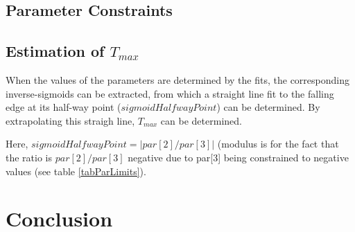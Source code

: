 \documentclass[12pt,epsfig]{article}
\def\tmax{$T_{max}$ }
\begin{document}
\subsection{Parameter Constraints}



\subsection{Estimation of \tmax}

When the values of the parameters are determined by the fits, the corresponding inverse-sigmoids 
can be extracted, from which a straight line fit to the falling edge at its half-way point ($sigmoidHalfwayPoint$)
can be determined. By extrapolating this straigh line, \tmax can be determined.

Here, $sigmoidHalfwayPoint = |par[2]/par[3]|$ (modulus is for the fact that the ratio is 
$par[2]/par[3]$ negative due to par[3] being constrained to negative values (see 
table \ref{tabParLimits}).



\section{Conclusion}
\end{document}
